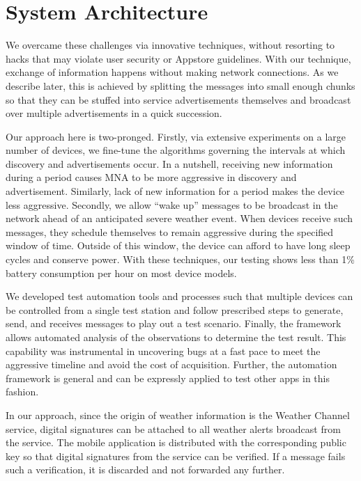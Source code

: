 \documentclass[conference]{IEEEtran}
\begin{document}
\section{System Architecture}
\label{sec:architecture}
%


We overcame these challenges via innovative techniques, without
resorting to hacks that may violate user security or Appstore
guidelines. With our technique, exchange of information happens
without making network connections. As we describe later, this is
achieved by splitting the messages into small enough chunks so that
they can be stuffed into service advertisements themselves and
broadcast over multiple advertisements in a quick succession.

Our approach here is two-pronged. Firstly, via extensive experiments
on a large number of devices, we fine-tune the algorithms governing
the intervals at which discovery and advertisements occur. In a
nutshell, receiving new information during a period causes MNA to be
more aggressive in discovery and advertisement. Similarly, lack of new
information for a period makes the device less aggressive. Secondly,
we allow ``wake up'' messages to be broadcast in the network ahead of
an anticipated severe weather event. When devices receive such
messages, they schedule themselves to remain aggressive during the
specified window of time. Outside of this window, the device can
afford to have long sleep cycles and conserve power. With these
techniques, our testing shows less than 1\% battery consumption per
hour on most device models.

We developed test automation tools and processes such that multiple
devices can be controlled from a single test station and follow
prescribed steps to generate, send, and receives messages to play out
a test scenario. Finally, the framework allows automated analysis of
the observations to determine the test result. This capability was
instrumental in uncovering bugs at a fast pace to meet the aggressive
timeline and avoid the cost of acquisition. Further, the automation
framework is general and can be expressly applied to test other apps
in this fashion.

In our approach, since the origin of weather information is the
Weather Channel service, digital signatures can be attached to all
weather alerts broadcast from the service. The mobile application is
distributed with the corresponding public key so that digital
signatures from the service can be verified. If a message fails such a
verification, it is discarded and not forwarded any further.
\end{document}
